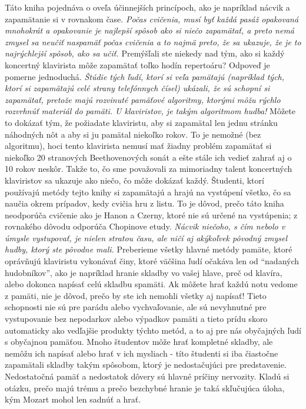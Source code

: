 Táto kniha pojednáva o oveľa účinnejších princípoch, ako je napríklad nácvik a zapamätanie si v rovnakom čase. \emph{Počas cvičenia, musí byť každá pasáž opakovaná mnohokrát a opakovanie je najlepší spôsob ako si niečo zapamätať, a preto nemá zmysel sa neučiť naspamäť počas cvičenia a to najmä preto, že sa ukazuje, že je to najrýchlejší spôsob, ako sa učiť.} Premýšľali ste niekedy nad tým, ako si každý koncertný klavirista môže zapamätať toľko hodín repertoáru? Odpoveď je pomerne jednoduchá. \emph{Štúdie tých ľudí, ktorí si veľa pamätajú (napríklad tých, ktorí si zapamätajú celé strany telefónnych čísel) ukázali, že sú schopní si zapamätať, pretože majú rozvinuté pamäťové algoritmy, ktorými môžu rýchlo rozvrhnúť materiál do pamäti. U klaviristov, je takým algoritmom hudba!} Môžete to dokázať tým, že požiadate klaviristu, aby si zapamätal len jednu stránku náhodných nôt a aby si ju pamätal niekoľko rokov. To je nemožné (bez algoritmu), hoci tento klavirista nemusí mať žiadny problém zapamätať si niekoľko 20 stranových Beethovenových sonát a ešte stále ich vedieť zahrať aj o 10 rokov neskôr. Takže to, čo sme považovali za mimoriadny talent koncertných klaviristov sa ukazuje ako niečo, čo môže dokázať každý. Študenti, ktorí používajú metódy tejto knihy si zapamätajú a hrajú na vystúpení všetko, čo sa naučia okrem prípadov, kedy cvičia hru z listu. To je dôvod, prečo táto kniha neodporúča cvičenie ako je Hanon a Czerny, ktoré nie sú určené na vystúpenia; z rovnakého dôvodu odporúča Chopinove etudy. \emph{Nácvik niečoho, s čím nebolo v úmysle vystupovať, je nielen stratou času, ale ničí aj akýkoľvek pôvodný zmysel hudby, ktorý ste pôvodne mali.} Preberieme všetky hlavné metódy pamäte, ktoré oprávňujú klaviristu vykonávať činy, ktoré väčšina ľudí očakáva len od “nadaných hudobníkov”, ako je napríklad hranie skladby vo vašej hlave, preč od klavíra, alebo dokonca napísať celú skladbu spamäti. Ak môžete hrať každú notu vedome z pamäti, nie je dôvod, prečo by ste ich nemohli všetky aj napísať! Tieto schopnosti nie sú pre parádu alebo vychvaľovanie, ale sú nevyhnutné pre vystupovanie bez nepodarkov alebo výpadkov pamäti a tieto prídu skoro automaticky ako vedľajšie produkty týchto metód, a to aj pre nás obyčajných ľudí s obyčajnou pamäťou. Mnoho študentov môže hrať kompletné skladby, ale nemôžu ich napísať alebo hrať v ich mysliach - títo študenti si iba čiastočne zapamätali skladby takým spôsobom, ktorý je nedostačujúci pre predstavenie. Nedostatočná pamäť a nedostatok dôvery sú hlavné príčiny nervozity. Kladú si otázku, prečo majú trému a prečo bezchybné hranie je taká skľučujúca úloha, kým Mozart mohol len sadnúť a hrať.

